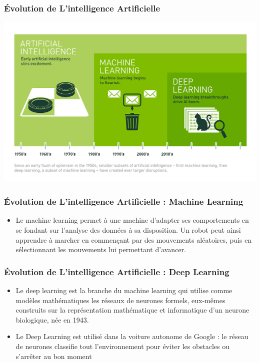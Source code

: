 \documentclass{beamer}
\begin{document}
	\begin{frame}[fragile]
	\frametitle{Évolution de L'intelligence  Artificielle}
	
	\centerline{\includegraphics{evolution.png}}
	
	\end{frame}
	
	\begin{frame}[fragile]
	\frametitle{Évolution de L'intelligence  Artificielle : Machine Learning}
	\begin{itemize}
		\item Le machine learning permet à une machine d’adapter ses comportements en se fondant sur l’analyse des données à sa disposition. Un robot peut ainsi apprendre à marcher en commençant par des mouvements aléatoires, puis en sélectionnant les mouvements lui permettant d’avancer.
	\end{itemize}
	\end{frame}
	
	\begin{frame}[fragile]
	\frametitle{Évolution de L'intelligence  Artificielle : Deep Learning}
	\begin{itemize}
		\itemsep1em
		\item Le deep learning est la branche du machine learning qui utilise comme modèles mathématiques les réseaux de neurones formels, eux-mêmes construits sur la représentation mathématique et informatique d’un neurone biologique, née en 1943.
		\item  Le Deep Learning est utilisé dans la voiture autonome  de Google : le réseau de  neurones 	classifie tout l’environnement pour éviter les obstacles ou s’arrêter au bon moment 
	\end{itemize}
	\end{frame}
	
\end{document}
